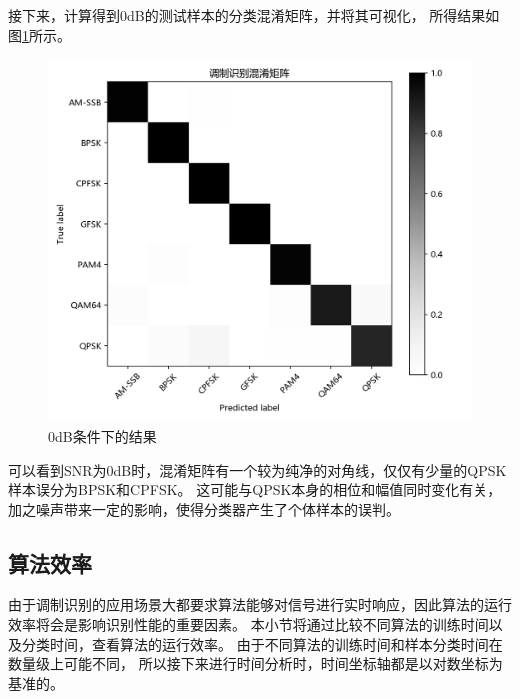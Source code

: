 接下来，计算得到0dB的测试样本的分类混淆矩阵，并将其可视化，
所得结果如图\ref{sec:fig_3_10}所示。\par
\begin{figure}[!h]
	\centering
	\includegraphics[scale=0.7]{figures/chapter_3/fig_3_10}
	\caption{0dB条件下的结果}	\label{sec:fig_3_10}
\end{figure}
可以看到SNR为0dB时，混淆矩阵有一个较为纯净的对角线，仅仅有少量的QPSK样本误分为BPSK和CPFSK。
这可能与QPSK本身的相位和幅值同时变化有关，加之噪声带来一定的影响，使得分类器产生了个体样本的误判。\par

\subsection{算法效率}

由于调制识别的应用场景大都要求算法能够对信号进行实时响应，因此算法的运行效率将会是影响识别性能的重要因素。
本小节将通过比较不同算法的训练时间以及分类时间，查看算法的运行效率。
由于不同算法的训练时间和样本分类时间在数量级上可能不同，
所以接下来进行时间分析时，时间坐标轴都是以对数坐标为基准的。\par

